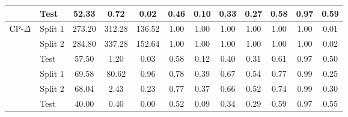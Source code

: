 \begin{table}[!tbp]
{\begin{tabular}{ll|cccccccccc}
& Test    & 52.33 & 0.72 & 0.02 & 0.46 & 0.10 & 0.33 & 0.27 & 0.58 & 0.97 & 0.59 \\
\midrule
{}
& Split 1 & 273.20 & 312.28 & 136.52 & 1.00 & 1.00 & 1.00 & 1.00 & 1.00 & 1.00 & 0.01 \\
& Split 2 & 284.80 & 337.28 & 152.64 & 1.00 & 1.00 & 1.00 & 1.00 & 1.00 & 1.00 & 0.02 \\
& Test    & 57.50 & 1.20 & 0.03 & 0.58 & 0.12 & 0.40 & 0.31 & 0.61 & 0.97 & 0.50 \\
\midrule
{}
& Split 1 & 69.58 & 80.62 & 0.96 & 0.78 & 0.39 & 0.67 & 0.54 & 0.77 & 0.99 & 0.25 \\
& Split 2 & 68.04 & 2.43 & 0.23 & 0.77 & 0.37 & 0.66 & 0.52 & 0.74 & 0.99 & 0.30 \\
& Test    & 40.00 & 0.40 & 0.00 & 0.52 & 0.09 & 0.34 & 0.29 & 0.59 & 0.97 & 0.55 \\
\bottomrule
\end{tabular}}
\end{table}

